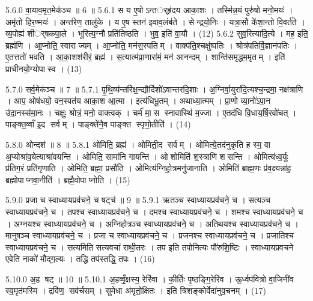5.6.0
वा॒याव॒मृत॒मेक॑ञ्च ॥ 6 ॥
5.6.1
स य ए॒षोऽन्तर््हृ॑दय आका॒शः । तस्मि॑न्न॒यं पुरु॑षो मनो॒मयः॑ । अमृ॑तो हिर॒ण्मयः॑ । अन्त॑रेण॒ तालु॑के । य ए॒ष स्तन॑ इवाव॒लंब॑ते । सेन्द्रयो॒निः । यत्रा॒सौ के॑शा॒न्तो वि॒वर्त॑ते । व्य॒पोह्य॑ शीर््षकपा॒ले । भूरित्य॒ग्नौ प्रति॑तिष्ठति । भुव॒ इति॑ वा॒यौ । (12)
5.6.2
सुव॒रित्या॑दि॒त्ये । मह॒ इति॒ ब्रह्म॑णि । आ॒प्नोति॒ स्वाराज्यम् । आ॒प्नोति॒ मन॑स॒स्पतिम् । वाक्प॑ति॒श्चक्षु॑ष्पतिः । श्रोत्र॑पतिर्वि॒ज्ञान॑पतिः । ए॒तत्ततो॑ भवति । आ॒का॒शश॑रीरं॒ ब्रह्म॑ । स॒त्यात्म॑प्रा॒णारा॑मं॒ मन॑ आनन्दम् । शान्ति॑समृद्धम॒मृतम् । इति॑ प्राचीनयो॒ग्योपास्व । (13)
\anuvakamend

5.7.0
सर्व॒मेक॑ञ्च ॥ 7 ॥
5.7.1
पृ॒थि॒व्य॑न्तरि॑क्ष॒न्द्यौर्दिशो॑ऽवान्तरदि॒शाः । अ॒ग्निर्वा॒युरा॑दि॒त्यश्च॒न्द्रमा॒ नक्ष॑त्राणि । आप॒ ओष॑धयो॒ वन॒स्पत॑य आका॒श आ॒त्मा । इत्य॑धिभू॒तम् । अथाध्या॒त्मम् । प्रा॒णो व्या॒नो॑ऽपा॒न उ॑दा॒नस्स॑मा॒नः । चक्षुः॒ श्रोत्रं॒ मनो॒ वाक्त्वक् । चर्म॑ मा॒स स्नावास्थि॑ म॒ज्जा । ए॒तद॑धि वि॒धाय॒र्\mbox{}षि॒रवो॑चत् । पाङ्क्त॒व्वाँ इ॒द सर्वम् । पाङ्क्ते॑नै॒व पाङ्क्त स्पृणो॒तीति॑ । (14)
\anuvakamend

5.8.0
ओन्दश॑ ॥ 8 ॥
5.8.1
ओमिति॒ ब्रह्म॑ । ओमिती॒द सर्वम् । ओमित्ये॒तद॑नुकृति ह स्म॒ वा अ॒प्योश्रा॑व॒येत्याश्रा॑वयन्ति । ओमिति॒ सामा॑नि गायन्ति । ओशोमिति॑ श॒स्त्राणि॑ शसन्ति । ओमित्य॑ध्व॒र्युः प्र॑तिग॒रं प्रति॑गृणाति । ओमिति॒ ब्रह्मा॒ प्रसौ॑ति । ओमित्य॑ग्निहो॒त्रमनु॑जानाति । ओमिति॑ ब्राह्म॒णः प्र॑व॒क्ष्यन्ना॑ह॒ ब्रह्मोपाप्नवा॒नीति॑ । ब्रह्मै॒वोपाप्नोति । (15)
\anuvakamend

5.9.0
प्रजा च स्वाध्यायप्रव॑चने॒ च षट्च॑ ॥ 9 ॥
5.9.1
ऋतञ्च स्वाध्यायप्रव॑चने॒ च । सत्यञ्च स्वाध्यायप्रव॑चने॒ च । तपश्च स्वाध्यायप्रव॑चने॒ च । दमश्च स्वाध्यायप्रव॑चने॒ च । शमश्च स्वाध्यायप्रव॑चने॒ च । अग्नयश्च स्वाध्यायप्रव॑चने॒ च । अग्निहोत्रञ्च स्वाध्यायप्रव॑चने॒ च । अतिथयश्च स्वाध्यायप्रव॑चने॒ च । मानुषञ्च स्वाध्यायप्रव॑चने॒ च । प्रजा च स्वाध्यायप्रव॑चने॒ च । प्रजनश्च स्वाध्यायप्रव॑चने॒ च । प्रजातिश्च स्वाध्यायप्रव॑चने॒ च । सत्यमिति सत्यवचा॑ राथी॒तरः । तप इति तपोनित्यः पौ॑रुशि॒ष्टिः । स्वाध्यायप्रवचने एवेति नाको॑ मौद्ग॒ल्यः । तद्धि तप॑स्तद्धि॒ तपः । (16)
\anuvakamend

5.10.0
अ॒ह षट् ॥ 10 ॥
5.10.1
अ॒हव्वृँ॒क्षस्य॒ रेरि॑वा । की॒र्तिः पृ॒ष्ठङ्गि॒रेरि॑व । ऊ॒र्ध्वप॑वित्रो वा॒जिनी॑व स्व॒मृत॑मस्मि । द्रवि॑ण॒ सव॑र्चसम् । सुमेधा अ॑मृतो॒क्षितः । इति त्रिशङ्कोर्वेदा॑नुव॒चनम् । (17)
\anuvakamend

